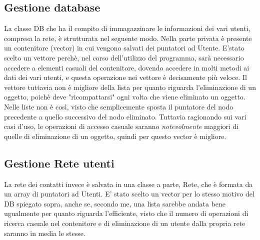\documentclass[openany, a4paper,11pt] {report}
\begin{document}
\subsection{Gestione database}
La classe DB che ha il compito di immagazzinare le informazioni dei vari utenti, compresa la rete, è strutturata nel seguente modo.
Nella parte privata è presente un contenitore (vector) in cui vengono salvati dei puntatori ad Utente. E'stato scelto un vettore perchè, nel corso dell'utilizzo del programma, sarà necessario accedere a elementi casuali del contenitore, dovendo accedere in molti metodi ai dati dei vari utenti, e questa operazione nei vettore è decisamente più veloce. Il vettore tuttavia non è migliore della lista per quanto riguarda l'eliminazione di un oggetto, poichè deve "ricompattarsi" ogni volta che viene eliminato un oggetto. Nelle liste non è così, visto che semplicemente sposta il puntatore del nodo precedente a quello successivo del nodo eliminato. Tuttavia ragionando sui vari casi d'uso, le operazioni di accesso casuale saranno \textsl{notevolmente} maggiori di quelle di eliminazione di un oggetto, quindi per questo vector è migliore.  


\subsection{Gestione Rete utenti}
La rete dei contatti invece è salvata in una classe a parte, Rete, che è formata da un array di puntatori ad Utenti. E' stato scelto un vector per lo stesso motivo del DB spiegato sopra, anche se, secondo me, una lista sarebbe andata bene ugualmente per quanto riguarda l'efficiente, visto che il numero di operazioni di ricerca casuale nel contenitore e di eliminazione di un utente dalla propria rete saranno in media le stesse.
\end{document}
